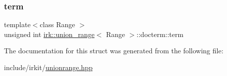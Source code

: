 \subsubsection{\texorpdfstring{term}{term}}
{\footnotesize\ttfamily template$<$class Range $>$ \\
unsigned int \mbox{\hyperlink{classirk_1_1union__range}{irk\+::union\+\_\+range}}$<$ Range $>$\+::docterm\+::term}



The documentation for this struct was generated from the following file\+:\begin{DoxyCompactItemize}
\item 
include/irkit/\mbox{\hyperlink{unionrange_8hpp}{unionrange.\+hpp}}\end{DoxyCompactItemize}
